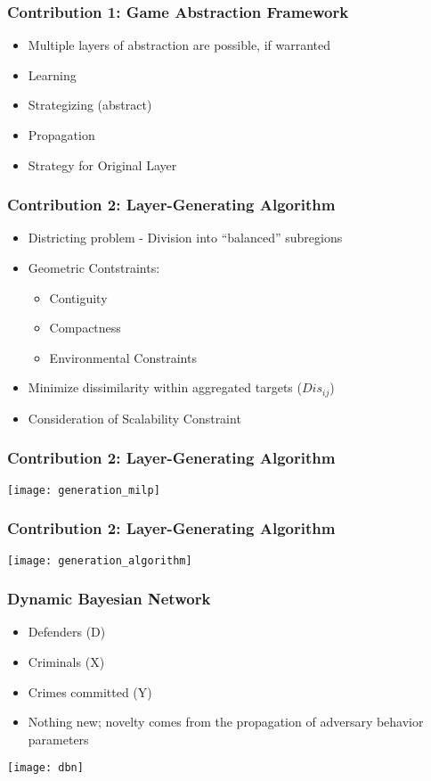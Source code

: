 \documentclass{beamer}
\begin{document}
	\begin{frame}
		\frametitle{Contribution 1: Game Abstraction Framework}
		\begin{itemize}
			\item Multiple layers of abstraction are possible, if warranted
			\item Learning
			\item Strategizing (abstract)
			\item Propagation
			\item Strategy for Original Layer
		\end{itemize}
	\end{frame}

	\begin{frame}
		\frametitle{Contribution 2: Layer-Generating Algorithm}
		\begin{itemize}
			\item Districting problem - Division into ``balanced'' subregions
			\item Geometric Contstraints:
				\begin{itemize}
					\item Contiguity
					\item Compactness
					\item Environmental Constraints
				\end{itemize}
			\item Minimize dissimilarity within aggregated targets ($Dis_{ij}$)
			\item Consideration of Scalability Constraint

		\end{itemize}
	\end{frame}

	\begin{frame}
		\frametitle{Contribution 2: Layer-Generating Algorithm}
		\texttt{[image: generation\_milp]}
	\end{frame}

	\begin{frame}
		\frametitle{Contribution 2: Layer-Generating Algorithm}
		\texttt{[image: generation\_algorithm]}
	\end{frame}

	\begin{frame}
		\frametitle{Dynamic Bayesian Network}
		\begin{itemize}
			\item Defenders (D)
			\item Criminals (X)
			\item Crimes committed (Y)
			\item Nothing new; novelty comes from the propagation of adversary behavior parameters
		\end{itemize}
		\texttt{[image: dbn]}
	\end{frame}
\end{document}
